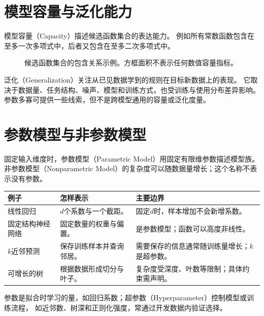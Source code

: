 \section{模型容量与泛化能力}
\label{sec:learn-capacity}
模型容量（Capacity）描述候选函数集合的表达能力。
例如所有常数函数包含在至多一次多项式中，后者又包含在至多二次多项式中。

\begin{figure}[htbp]
\centering
\caption{候选函数集合的包含关系示例。方框面积不表示任何数值容量指标。}
\par\smallskip
{}
\end{figure}

泛化（Generalization）关注从已见数据学到的规则在目标新数据上的表现。
它取决于数据量、任务结构、噪声、模型和训练方式，也受训练与使用分布差异影响。
参数多寡可提供一些线索，但不是跨模型通用的容量或泛化度量。


\section{参数模型与非参数模型}
\label{sec:learn-parametric}
固定输入维度时，参数模型（Parametric Model）用固定有限维参数描述模型族。
非参数模型（Nonparametric Model）的复杂度可以随数据量增长；这个名称不表示没有参数。

\begin{center}
\begin{tabularx}{\textwidth}{P{32mm}P{47mm}Y}
\toprule
例子 & 怎样表示 & 主要边界\\
\midrule
线性回归 & $d$个系数与一个截距。 & 固定$d$时，样本增加不会新增系数。\\
固定结构神经网络 & 固定数量的权重与偏置。 & 是参数模型；函数可以高度非线性。\\
$k$近邻预测 & 保存训练样本并查询邻居。 & 需要保存的信息通常随训练量增长；$k$是超参数。\\
可增长的树 & 根据数据形成切分与叶子。 & 复杂度受深度、叶数等限制；具体约束需声明。\\
\bottomrule
\end{tabularx}
\end{center}

参数是拟合时学习的量，如回归系数；超参数（Hyperparameter）控制模型或训练流程，
如近邻数、树深和正则化强度，常通过开发数据内验证选择。

